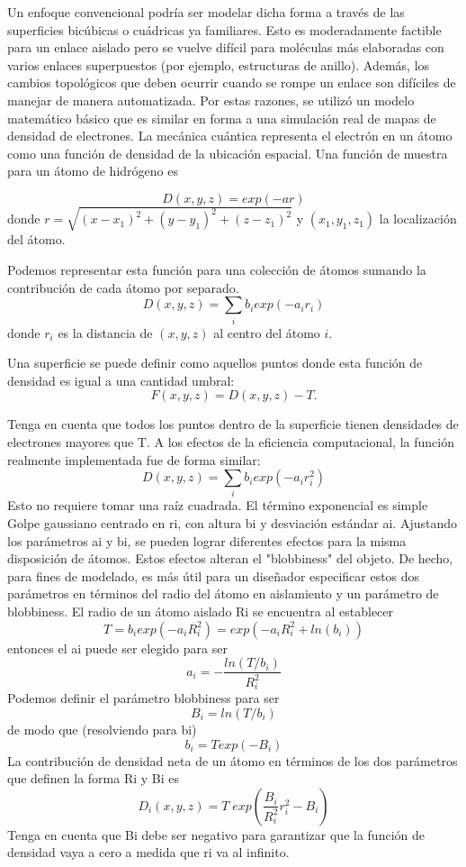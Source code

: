 Un enfoque convencional podría ser modelar dicha forma a través de las superficies bicúbicas o cuádricas ya familiares. Esto es moderadamente factible para un enlace aislado pero se vuelve difícil para moléculas más elaboradas con varios enlaces superpuestos (por ejemplo, estructuras de anillo). Además, los cambios topológicos que deben ocurrir cuando se rompe un enlace son difíciles de manejar de manera automatizada. Por estas razones, se utilizó un modelo matemático básico que es similar en forma a una simulación real de mapas de densidad de electrones. La mecánica cuántica representa el electrón en un átomo como una función de densidad de la ubicación espacial. Una función de muestra para un átomo de hidrógeno es

\[
	D(x, y, z) = exp(-ar)
\]
donde $r = \sqrt{(x-x_1)^2 + (y-y_1)^2 + (z-z_1)^2}$ y $(x_1, y_1, z_1)$ la localización del átomo.

Podemos representar esta función para una colección de átomos sumando la contribución de cada átomo por separado.
\[
	D(x, y, z) = \sum_{i} b_i exp(-a_i r_i)
\]
donde $r_i$ es la distancia de $(x,y,z)$ al centro del átomo $i$.

Una superficie se puede definir como aquellos puntos donde esta función de densidad es igual a una cantidad umbral:
\[
	F ( x, y, z) = D ( x, y, z) - T.
\]

Tenga en cuenta que todos los puntos dentro de la superficie tienen densidades de electrones mayores que T. A los efectos de la eficiencia computacional, la función realmente implementada fue de forma similar:
\[
	D(x, y, z) = \sum_{i} b_i exp(-a_i r^{2}_{i})
\]
Esto no requiere tomar una raíz cuadrada. El término exponencial es simple
Golpe gaussiano centrado en ri, con altura bi y desviación estándar ai. Ajustando los parámetros ai y bi, se pueden lograr diferentes efectos para la misma disposición de átomos. Estos efectos alteran el "blobbiness" del objeto. De hecho, para fines de modelado, es más útil para un diseñador especificar estos dos parámetros en términos del radio del átomo en aislamiento y un parámetro de blobbiness. El radio de un átomo aislado Ri se encuentra al establecer
\[
	T = b_i exp(-a_i R^{2}_{i}) = exp (-a_i R^{2}_{i} + ln (b_i))
\]
entonces el ai puede ser elegido para ser
\[
	a_i = - \frac{ln(T/b_i)}{R^{2}_{i}}
\]
Podemos definir el parámetro blobbiness para ser
\[
	B_i = ln(T/b_i)
\]
de modo que (resolviendo para bi)
\[
	b_i = T exp(-B_i)
\]
La contribución de densidad neta de un átomo en términos de los dos parámetros que definen la forma Ri y Bi es
\[
	D_i(x,y,z) = T \; exp ( \frac{B_i}{R^{2}_{i}}r^{2}_{i} -B_i)
\]
Tenga en cuenta que Bi debe ser negativo para garantizar que la función de densidad vaya a cero a medida que ri va al infinito.

